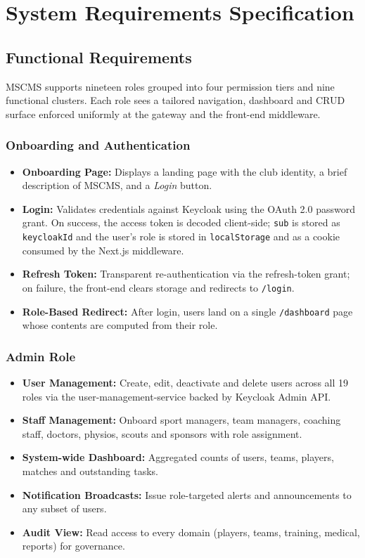 \documentclass[12pt,a4paper,oneside]{report}
\begin{document}
\chapter{System Requirements Specification}
\label{ch:requirements}

\section{Functional Requirements}
\label{sec:functional-reqs}
MSCMS supports nineteen roles grouped into four permission tiers and
nine functional clusters. Each role sees a tailored navigation,
dashboard and CRUD surface enforced uniformly at the gateway and the
front-end middleware.

\subsection*{Onboarding and Authentication}
\begin{itemize}[leftmargin=*]
  \item \textbf{Onboarding Page:} Displays a landing page with the
        club identity, a brief description of MSCMS, and a
        \emph{Login} button.
  \item \textbf{Login:} Validates credentials against Keycloak using
        the OAuth 2.0 password grant. On success, the access token is
        decoded client-side; \texttt{sub} is stored as
        \texttt{keycloakId} and the user's role is stored in
        \texttt{localStorage} and as a cookie consumed by the Next.js
        middleware.
  \item \textbf{Refresh Token:} Transparent re-authentication via the
        refresh-token grant; on failure, the front-end clears storage
        and redirects to \texttt{/login}.
  \item \textbf{Role-Based Redirect:} After login, users land on a
        single \texttt{/dashboard} page whose contents are computed
        from their role.
\end{itemize}

\subsection*{Admin Role}
\begin{itemize}[leftmargin=*]
  \item \textbf{User Management:} Create, edit, deactivate and delete
        users across all 19 roles via the user-management-service
        backed by Keycloak Admin API.
  \item \textbf{Staff Management:} Onboard sport managers, team
        managers, coaching staff, doctors, physios, scouts and
        sponsors with role assignment.
  \item \textbf{System-wide Dashboard:} Aggregated counts of users,
        teams, players, matches and outstanding tasks.
  \item \textbf{Notification Broadcasts:} Issue role-targeted alerts
        and announcements to any subset of users.
  \item \textbf{Audit View:} Read access to every domain (players,
        teams, training, medical, reports) for governance.
\end{itemize}
\end{document}
